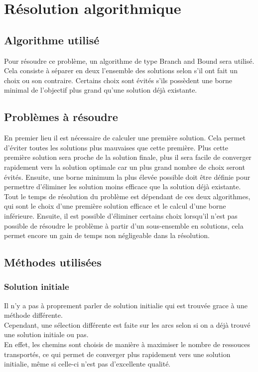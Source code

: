 \documentclass[a4paper, 12pt]{report}
\begin{document}
\chapter{Résolution algorithmique}
\section{Algorithme utilisé}

Pour résoudre ce problème, un algorithme de type Branch and Bound sera utilisé.
Cela consiste à séparer en deux l'ensemble des solutions selon s'il ont fait un choix ou son contraire.
Certains choix sont évités s'ils possèdent une borne minimal de l'objectif plus grand qu'une solution déjà existante. 

\section{Problèmes à résoudre}
En premier lieu il est nécessaire de calculer une première solution. 
Cela permet d'éviter toutes les solutions plus mauvaises que cette première.
Plus cette première solution sera proche de la solution finale, 
plus il sera facile de converger rapidement vers la solution optimale car un plus grand nombre de choix seront évités.
\newline{}
\newline{}
Ensuite, une borne minimum la plus élevée possible doit être définie 
pour permettre d'éliminer les solution moins efficace que la solution déjà existante. 
Tout le temps de résolution du problème est dépendant de ces deux algorithmes, 
qui sont le choix d'une première solution efficace et le calcul d'une borne inférieure. 
\newline{}
\newline{}
Ensuite, il est possible d'éliminer certains choix lorsqu'il n'est pas possible de résoudre le problème 
à partir d'un sous-ensemble en solutions, cela permet encore un gain de temps non négligeable dans la résolution.

\section{Méthodes utilisées}
\subsection{Solution initiale}
Il n'y a pas à proprement parler de solution initialie qui est trouvée grace à une méthode différente.\\
Cependant, une sélection différente est faite sur les arcs selon si on a déjà trouvé une solution initiale ou pas.\\
En effet, les chemins sont choisis de manière à maximiser le nombre de ressouces transportés, 
ce qui permet de converger plus rapidement vers une solution initialie, même si celle-ci n'est pas d'excellente qualité.\\
\end{document}
